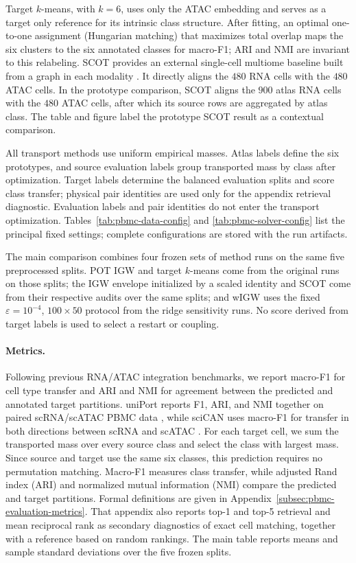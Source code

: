 \documentclass[11pt]{article}
\theoremstyle{plain}
\theoremstyle{definition}
\theoremstyle{remark}
\begin{document}
Target \(k\)-means, with \(k=6\), uses only the ATAC embedding and serves as a
target only reference for its intrinsic class structure. After fitting, an optimal
one-to-one assignment (Hungarian matching) that maximizes total overlap maps the
six clusters to the six annotated classes for macro-F1; ARI and NMI are invariant
to this relabeling. SCOT provides an external single-cell multiome baseline
built from a graph in each modality \cite{DemetciEtAl2022}. It directly aligns the
\(480\) RNA cells with the \(480\) ATAC cells. In the prototype comparison, SCOT
aligns the \(900\) atlas RNA cells with the \(480\) ATAC cells, after which its
source rows are aggregated by atlas class. The table and figure label the
prototype SCOT result as a contextual comparison.

All transport methods use uniform empirical masses. Atlas labels define the six
prototypes, and source evaluation labels group transported mass by class after
optimization. Target labels determine the balanced evaluation splits and score
class transfer; physical pair identities are used only for the appendix
retrieval diagnostic.
Evaluation labels and pair identities do not enter the transport optimization.
Tables~\ref{tab:pbmc-data-config} and
\ref{tab:pbmc-solver-config} list the principal fixed settings; complete
configurations are stored with the run artifacts.

The main comparison combines four frozen sets of method runs on the same five
preprocessed splits. POT IGW and target \(k\)-means come from the original runs on
those splits; the IGW envelope initialized by a scaled identity and SCOT come from
their respective audits over the same splits; and wIGW uses the fixed
\(\varepsilon=10^{-4}\), \(100\times50\) protocol from the ridge sensitivity runs.
No score derived from target labels is used to select a restart or coupling.

\paragraph{Metrics.}
Following previous RNA/ATAC integration benchmarks, we report macro-F1 for
cell type transfer and ARI and NMI for agreement between the predicted and
annotated target partitions. uniPort reports F1, ARI, and NMI together on
paired scRNA/scATAC PBMC data \cite{CaoGongHongWan2022}, while sciCAN uses
macro-F1 for transfer in both directions between scRNA and scATAC
\cite{XuBegoliMcCord2022}.
For each target cell, we sum the transported mass over every source class and
select the class with largest mass. Since source and target use the same six
classes, this prediction requires no permutation matching. Macro-F1 measures
class transfer, while adjusted Rand index (ARI) and normalized mutual information
(NMI) compare the predicted and target partitions. Formal definitions are given
in Appendix~\ref{subsec:pbmc-evaluation-metrics}. That appendix also reports
top-1 and top-5 retrieval and mean reciprocal rank as secondary diagnostics of
exact cell matching, together with a reference based on random rankings. The main table
reports means and sample standard deviations over the five frozen splits.
\end{document}
